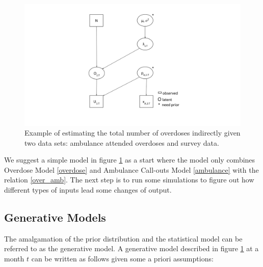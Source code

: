 \documentclass[12pt]{article}
\begin{document}
{\begin{figure}[htb]
	\centering
	\includegraphics[width=200mm,scale=0.5]{Figures/simple_drawing}
	\caption{Example of estimating the total number of overdoses indirectly given two data sets: ambulance attended overdoses and survey data.}
	\label{simple_draw}
\end{figure}

We suggest a simple model in figure \ref{simple_draw} as a start where the model only combines Overdose Model \ref{overdose} and Ambulance Call-outs Model \ref{ambulance} with the relation \ref{over_amb}. The next step is to run some simulations to figure out how different types of inputs lead some changes of output.

\subsection{Generative Models}
The amalgamation of the prior distribution and the statistical model can be referred to as the generative model.\cite{paul} A generative model described in figure \ref{simple_draw} at a month $t$ can be written as follows given some a priori assumptions:

}
\end{document}
